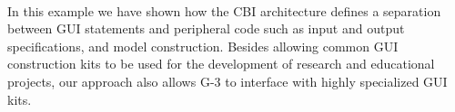 \documentclass[10pt]{article}
\begin{document}








\\

In this example we have shown how the CBI architecture defines a
separation between GUI statements and peripheral code such as input
and output specifications, and model construction.  Besides allowing
common GUI construction kits to be used for the development of
research and educational projects, our approach also allows G-3 to
interface with highly specialized GUI kits.
\end{document}
